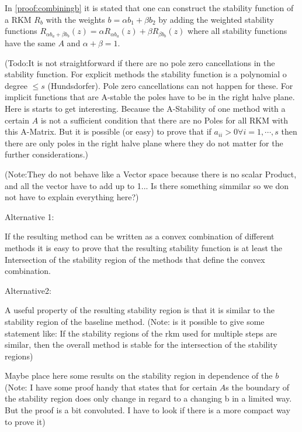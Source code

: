 \documentclass{article}
\begin{document}
In \ref{proof:combiningb} it is stated that one can construct the stability function of a RKM  $R_b$  with the weights $b = \alpha b_1 + \beta b_2$ by adding the weighted stability functions $R_{\alpha b_a+\beta b_b}(z) = \alpha R_{\alpha b_a}(z) + \beta R_{\beta b_b}(z) $ where all stability functions have the same $A$ and $\alpha + \beta = 1$.

(Todo:It is not straightforward if there are no pole zero cancellations in the stability function. For explicit methods the stability function is a polynomial o degree $\leq s$ (Hundsdorfer). Pole zero cancellations can not happen for these. For implicit functions that are A-stable the poles have to be in the right halve plane. Here is starts to get interesting. Because the A-Stability of one method with a certain $A$ is not a sufficient  condition that there are no Poles for all RKM with this A-Matrix. But it is possible (or easy) to prove that if $a_{ii} > 0 \forall i = 1,\cdots , s$ then there are only poles in the right halve plane where they do not matter for the further considerations.)



(Note:They do not behave like a Vector space because there is no scalar Product, and all the vector have to add up to 1... Is there something simmilar so we don not have to explain everything here?)


Alternative 1:

If the resulting method can be written as a convex combination of different methods it is easy to prove that the resulting stability function is at least the Intersection of the stability region of the methods that define the convex combination. 


Alternative2:

A useful property of the resulting stability region is that it is similar to the stability region of the baseline method. 
(Note: is it possible to give some statement like: If the stability regions of the rkm used for multiple steps are similar, then the overall method is stable for the intersection of the stability regions)

Maybe place here some results on the stability region in dependence of the $b$
(Note: I have some proof handy that states that for certain $A$s the boundary of the stability region does only change in regard to a changing b in a limited way. But the proof is a bit convoluted. I have to look if there is a more compact way to prove it)
\end{document}
